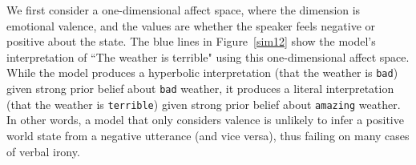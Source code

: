 \documentclass[10pt,letterpaper]{article}
\begin{document}
We first consider a one-dimensional affect space, where the dimension is emotional valence, and the values are whether the speaker feels negative or positive about the state.  
%
%
The blue lines in Figure~\ref{sim12} show the model's interpretation of ``The weather is terrible" using this one-dimensional affect space. While the model produces a hyperbolic interpretation (that the weather is \texttt{bad}) given strong prior belief about \texttt{bad} weather, it produces a literal interpretation (that the weather is \texttt{terrible}) given strong prior belief about \texttt{amazing} weather. In other words, a model that only considers valence is unlikely to infer a positive world state from a negative utterance (and vice versa), thus failing on many cases of verbal irony. 
\end{document}
